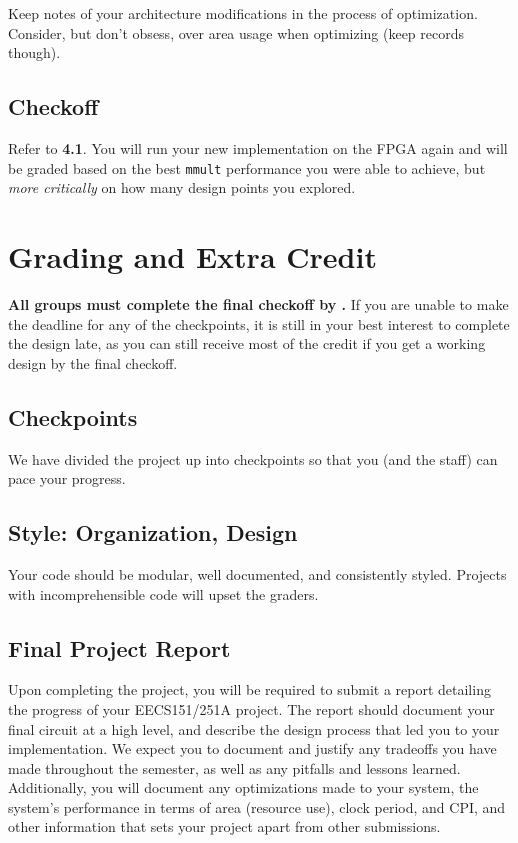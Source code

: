 \documentclass[11pt]{article}
\begin{document}
Keep notes of your architecture modifications in the process of optimization.
Consider, but don't obsess, over area usage when optimizing (keep records though).

\subsection{Checkoff}
Refer to \textbf{4.1}. You will run your new implementation on the FPGA again and will be graded based on the best \verb|mmult| performance you were able to achieve, but \textit{more critically} on how many design points you explored.
\pagebreak

\section{Grading and Extra Credit}
\textbf{All groups must complete the final checkoff by \finalCheckoffDueDate.}
If you are unable to make the deadline for any of the checkpoints, it is still in your best interest to complete the design late, as you can still receive most of the credit if you get a working design by the final checkoff.

\subsection{Checkpoints}
\label{checkoff}
We have divided the project up into checkpoints so that you (and the staff) can pace your progress.

\subsection{Style: Organization, Design}
\label{style}
Your code should be modular, well documented, and consistently styled.
Projects with incomprehensible code will upset the graders.

\subsection{Final Project Report}
Upon completing the project, you will be required to submit a report detailing the progress of your EECS151/251A project.
The report should document your final circuit at a high level, and describe the design process that led you to your implementation.
We expect you to document and justify any tradeoffs you have made throughout the semester, as well as any pitfalls and lessons learned.
Additionally, you will document any optimizations made to your system, the system's performance in terms of area (resource use), clock period, and CPI, and other information that sets your project apart from other submissions.
\end{document}
